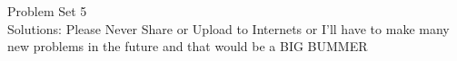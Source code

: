 \documentclass[12pt]{article}
\begin{document}

%
\newcommand{\detritus}[1]{}


\thispagestyle{empty}



\iffalse
\parindent = 0pt
\hspace*{0.0in}\parbox[t]{2.5in}{
Philosophy 24.241\\[3pt]
Symbolic Logic\\[3pt]
Fall, 2022
}
\fi 


\iffalse 
\begin{center}
\Large\bf Problem Set 5\\[1ex] 
 Due Fri. {\bf{October 14th}} by 5pm Eastern\\[3ex]
\end{center}
\fi

\begin{center}
\Large Problem Set 5 \\[1ex] 
\large Solutions: Please Never Share or Upload to Internets or I'll have to make many new problems in the future and that would be a BIG BUMMER \\[3ex] 
\end{center}


\end{document}
